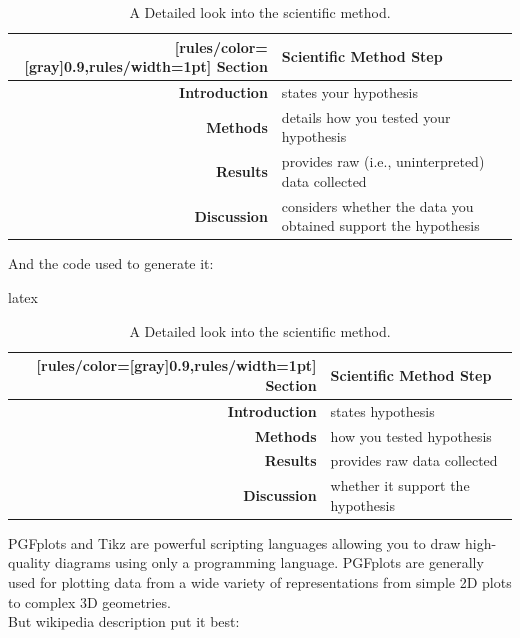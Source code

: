 \documentclass[minted, draw]{../tex/hebdomon}
\begin{document}
\begin{table}[!ht]
	\begin{NiceTabular}{rX}[rules/color=[gray]{0.9},rules/width=1pt]
		\CodeBefore
		\Body
		\toprule
		\textbf{Section}      & \textbf{Scientific Method Step}                                \\
		\midrule
		\textbf{Introduction} & states your hypothesis                                         \\
		\textbf{Methods}      & details how you tested your hypothesis                         \\
		\textbf{Results}      & provides raw (i.e., uninterpreted) data collected              \\
		\textbf{Discussion}   & considers whether the data you obtained support the hypothesis \\
		\bottomrule
	\end{NiceTabular}
	\caption{A Detailed look into the scientific method.}
\end{table}
%
And the code used to generate it:
%
\begin{code}{latex}
\begin{table}[!ht]
	\begin{NiceTabular}{rX}[rules/color=[gray]{0.9},rules/width=1pt]
		\CodeBefore
		\Body
		\toprule
		\textbf{Section}      & \textbf{Scientific Method Step}    \\
		\midrule
		\textbf{Introduction} & states   hypothesis                \\
		\textbf{Methods}      & how you tested hypothesis          \\
		\textbf{Results}      & provides raw  data collected       \\
		\textbf{Discussion}   &  whether it support the hypothesis \\
		\bottomrule
	\end{NiceTabular}
	\caption{A Detailed look into the scientific method.}
\end{table}
\end{code}



PGFplots and Tikz are powerful scripting languages allowing you to draw high-quality diagrams
using only a programming language. PGFplots are generally used for plotting data from a wide
variety of representations from simple 2D plots to complex 3D geometries.
\\
But wikipedia description put it best:
\end{document}
